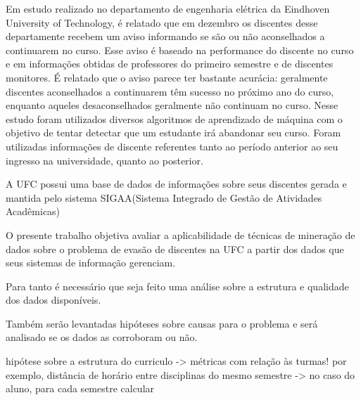 Em estudo realizado no departamento de engenharia elétrica da Eindhoven University of Technology\cite{Predicting_Students}, é relatado que em dezembro os discentes desse departamente recebem um aviso informando se são ou não aconselhados a continuarem no curso. Esse aviso é baseado na performance do discente no curso e em informações obtidas de professores do primeiro semestre e de discentes monitores. É relatado que o aviso parece ter bastante acurácia: geralmente discentes aconselhados a continuarem têm sucesso no próximo ano do curso, enquanto aqueles desaconselhados geralmente não continuam no curso. Nesse estudo foram utilizados diversos algoritmos de aprendizado de máquina com o objetivo de tentar detectar que um estudante irá abandonar seu curso. Foram utilizadas informações de discente referentes tanto ao período anterior ao seu ingresso na universidade, quanto ao posterior. 

A UFC possui uma base de dados de informações sobre seus discentes gerada e mantida pelo sistema SIGAA(Sistema Integrado de Gestão de Atividades Acadêmicas)

O presente trabalho objetiva avaliar a aplicabilidade de técnicas de mineração de dados sobre o problema de evasão de discentes na UFC a partir dos dados que seus sistemas de informação gerenciam.  

Para tanto é necessário que seja feito uma análise sobre a estrutura e qualidade dos dados disponíveis.

Também serão levantadas hipóteses sobre causas para o problema e será analisado se os dados as corroboram ou não.

hipótese sobre a estrutura do curriculo -> métricas com relação às turmas! por exemplo, distância de horário entre disciplinas do mesmo semestre -> no caso do aluno, para cada semestre calcular

\cite{EDM_brasil}